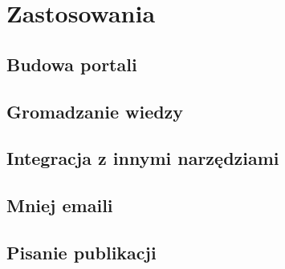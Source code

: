 \documentclass{article}
\begin{document}
	


\section{Zastosowania}
	\subsection{Budowa portali}  
	\subsection{Gromadzanie wiedzy}

	\subsection{Integracja z innymi narzędziami}
	\subsection{Mniej emaili}



	\subsection{Pisanie publikacji}
\end{document}
